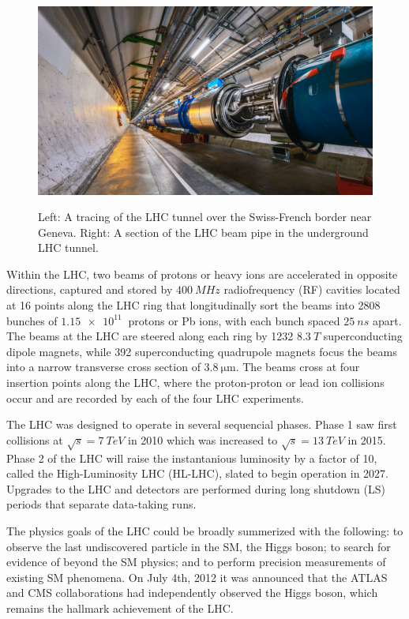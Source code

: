 \begin{figure}[H]
{    \includegraphics[height=\textwidth]{Images/CMS/LHCpipe.jpg}
    }
    \caption{Left: A tracing of the LHC tunnel over the Swiss-French border near Geneva. Right: A section of the LHC beam pipe in the underground LHC tunnel.}
    \label{fig:LHC}
\end{figure}

Within the LHC, two beams of protons or heavy ions are accelerated in opposite directions, captured and stored by $\SI{400}{MHz}$ radiofrequency (RF) cavities located at 16 points along the LHC ring that longitudinally sort the beams into 2808 bunches of $\SI{1.15e11}{}$ protons or Pb ions, with each bunch spaced $\SI{25}{ns}$ apart. The beams at the LHC are steered along each ring by 1232 $\SI{8.3}{T}$ superconducting dipole magnets, while 392 superconducting quadrupole magnets focus the beams into a narrow transverse cross section of $\SI{3.8}{\micro\meter}$. The beams cross at four insertion points along the LHC, where the proton-proton or lead ion collisions occur and are recorded by each of the four LHC experiments.

The LHC was designed to operate in several sequencial phases. Phase 1 saw first collisions at $\sqrt{s}=\SI{7}{TeV}$ in 2010 which was increased to $\sqrt{s}=\SI{13}{TeV}$ in 2015. Phase 2 of the LHC will raise the instantanious luminosity by a factor of 10, called the High-Luminosity LHC (HL-LHC), slated to begin operation in 2027. Upgrades to the LHC and detectors are performed during long shutdown (LS) periods that separate data-taking runs.

The physics goals of the LHC could be broadly summerized with the following: to observe the last undiscovered particle in the SM, the Higgs boson; to search for evidence of beyond the SM physics; and to perform precision measurements of existing SM phenomena. On July 4th, 2012 it was announced that the ATLAS and CMS collaborations had independently observed the Higgs boson, which remains the hallmark achievement of the LHC.